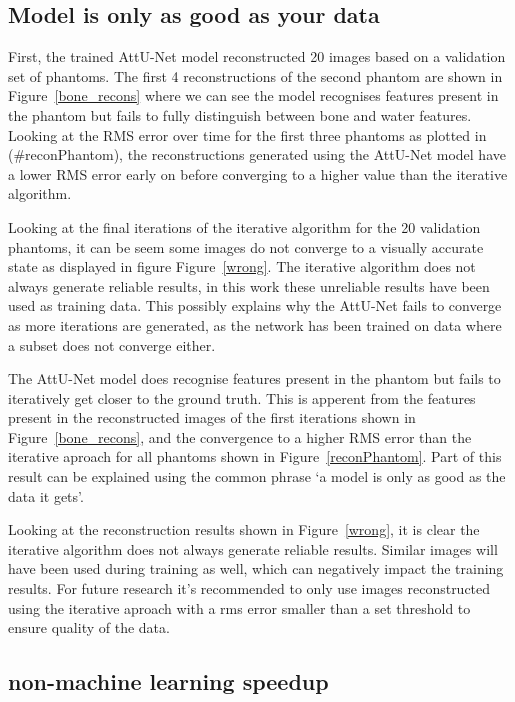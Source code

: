 \documentclass{article}
\begin{document}
\subsection{Model is only as good as your data}

First, the trained AttU-Net model reconstructed 20 images based on a validation set of phantoms. The first 4 reconstructions of the second phantom are shown in Figure~\ref{bone_recons} where we can see the model recognises features present in the phantom but fails to fully distinguish between bone and water features. Looking at the RMS error over time for the first three phantoms as plotted in (\#reconPhantom), the reconstructions generated using the AttU-Net model have a lower RMS error early on before converging to a higher value than the iterative algorithm.

Looking at the final iterations of the iterative algorithm for the 20 validation phantoms, it can be seem some images do not converge to a visually accurate state as displayed in figure Figure~\ref{wrong}. The iterative algorithm does not always generate reliable results, in this work these unreliable results have been used as training data. This possibly explains why the AttU-Net fails to converge as more iterations are generated, as the network has been trained on data where a subset does not converge either.

The AttU-Net model does recognise features present in the phantom but fails to iteratively get closer to the ground truth. This is apperent from the features present in the reconstructed images of the first iterations shown in Figure~\ref{bone_recons}, and the convergence to a higher RMS error than the iterative aproach for all phantoms shown in Figure~\ref{reconPhantom}. Part of this result can be explained using the common phrase `a model is only as good as the data it gets'.

Looking at the reconstruction results shown in Figure~\ref{wrong}, it is clear the iterative algorithm does not always generate reliable results. Similar images will have been used during training as well, which can negatively impact the training results. For future research it's recommended to only use images reconstructed using the iterative aproach with a rms error smaller than a set threshold to ensure quality of the data.

\subsection{non-machine learning speedup}
\end{document}
